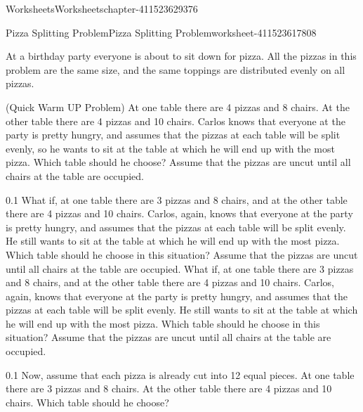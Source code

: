 \documentclass[twoside,11pt,]{book}
\begin{document}
\begin{chapterptx}{Worksheets}{}{Worksheets}{}{}{chapter-411523629376}
%
%
\typeout{************************************************}
\typeout{************************************************}
%
\begin{worksheet-section-numberless}{Pizza Splitting Problem}{}{Pizza Splitting Problem}{}{}{worksheet-411523617808}
\begin{introduction}{}%
\hypertarget{p-411523621664}{}%
At a birthday party everyone is about to sit down for pizza.  All the pizzas in this problem are the same size, and the same toppings are distributed evenly on all pizzas.%
\end{introduction}%
\hypertarget{p-411523594336}{}%
(Quick Warm UP Problem) At one table there are 4 pizzas and 8 chairs.  At the other table there are 4 pizzas and 10 chairs.  Carlos knows that everyone at the party is pretty hungry, and assumes that the pizzas at each table will be split evenly, so he wants to sit at the table at which he will end up with the most pizza.  Which table should he choose?  Assume that the pizzas are uncut until all chairs at the table are occupied.%
\begin{divisionexercise}{1}{}{0.1}{
        What if, at one table there are 3 pizzas and 8 chairs, and at the other table there are 4 pizzas and 10 chairs.  Carlos, again, knows that everyone at the party is pretty hungry, and assumes that the pizzas at each table will be split evenly.  He still wants to sit at the table at which he will end up with the most pizza.  Which table should he choose in this situation? Assume that the pizzas are uncut until all chairs at the table are occupied.
      }%
\hypertarget{p-411523592864}{}%
What if, at one table there are 3 pizzas and 8 chairs, and at the other table there are 4 pizzas and 10 chairs.  Carlos, again, knows that everyone at the party is pretty hungry, and assumes that the pizzas at each table will be split evenly.  He still wants to sit at the table at which he will end up with the most pizza.  Which table should he choose in this situation? Assume that the pizzas are uncut until all chairs at the table are occupied.%
\end{divisionexercise}%
\begin{divisionexercise}{2}{}{0.1}{
        Now, assume that each pizza is already cut into 12 equal pieces. At one table there are 3 pizzas and 8 chairs.  At the other table there are 4 pizzas and 10 chairs.  Which table should he choose?
}
\end{divisionexercise}
\end{worksheet-section-numberless}
\end{chapterptx}
\end{document}
